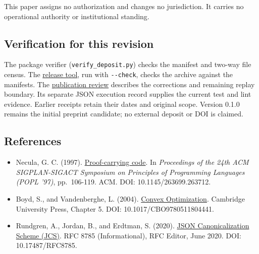 \documentclass[
  11pt,
]{article}
\providecommand{\tightlist}{%
  \setlength{\itemsep}{0pt}\setlength{\parskip}{0pt}}
\begin{document}
This paper assigns no authorization and changes no jurisdiction. It
carries no operational authority or institutional standing.

\hypertarget{verification-for-this-revision}{%
\subsection{Verification for this
revision}\label{verification-for-this-revision}}

The package verifier (\texttt{verify\_deposit.py}) checks the manifest
and two-way file census. The \href{tools/rebuild_release.py}{release
tool}, run with \texttt{-\/-check}, checks the archive against the
manifests. The \href{docs/publication_review_2026_10_02.md}{publication
review} describes the corrections and remaining replay boundary. Its
separate JSON execution record supplies the current test and lint
evidence. Earlier receipts retain their dates and original scope.
Version 0.1.0 remains the initial preprint candidate; no external
deposit or DOI is claimed.

\hypertarget{references}{%
\subsection{References}\label{references}}

\begin{itemize}
\tightlist
\item
  Necula, G. C. (1997).
  \href{https://doi.org/10.1145/263699.263712}{Proof-carrying code}. In
  \emph{Proceedings of the 24th ACM SIGPLAN-SIGACT Symposium on
  Principles of Programming Languages (POPL '97)}, pp.~106-119. ACM.
  DOI: 10.1145/263699.263712.
\item
  Boyd, S., and Vandenberghe, L. (2004).
  \href{https://doi.org/10.1017/CBO9780511804441}{Convex Optimization}.
  Cambridge University Press, Chapter 5. DOI: 10.1017/CBO9780511804441.
\item
  Rundgren, A., Jordan, B., and Erdtman, S. (2020).
  \href{https://www.rfc-editor.org/rfc/rfc8785}{JSON Canonicalization
  Scheme (JCS)}. RFC 8785 (Informational), RFC Editor, June 2020. DOI:
  10.17487/RFC8785.
\end{itemize}
\end{document}
